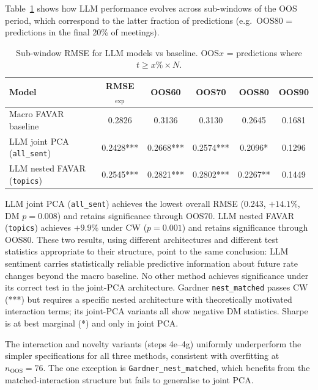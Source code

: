 Table~\ref{tab:oos_subwindow} shows how LLM performance evolves across sub-windows of the OOS period, which correspond to the latter fraction of predictions (e.g.\ OOS80 = predictions in the final 20\% of meetings).

\begin{table}[ht]
\centering
\caption{Sub-window RMSE for LLM models vs baseline. OOS$x$ = predictions where $t \geq x\% \times N$.}
\label{tab:oos_subwindow}
\small
\begin{tabular}{lccccc}
\toprule
Model & RMSE$_{\exp}$ & OOS60 & OOS70 & OOS80 & OOS90 \\
\midrule
Macro FAVAR baseline       & 0.2826 & 0.3136 & 0.3130 & 0.2645 & 0.1681 \\
LLM joint PCA (\texttt{all\_sent})  & 0.2428*** & 0.2668*** & 0.2574*** & 0.2096* & 0.1296 \\
LLM nested FAVAR (\texttt{topics})  & 0.2545*** & 0.2821*** & 0.2802*** & 0.2267** & 0.1449 \\
\bottomrule
\end{tabular}
\end{table}

\smallskip

LLM joint PCA (\texttt{all\_sent}) achieves the lowest overall RMSE (0.243, $+14.1\%$, DM $p = 0.008$) and retains significance through OOS70. LLM nested FAVAR (\texttt{topics}) achieves $+9.9\%$ under CW ($p = 0.001$) and retains significance through OOS80. These two results, using different architectures and different test statistics appropriate to their structure, point to the same conclusion: LLM sentiment carries statistically reliable predictive information about future rate changes beyond the macro baseline. No other method achieves significance under its correct test in the joint-PCA architecture. Gardner \texttt{nest\_matched} passes CW (***) but requires a specific nested architecture with theoretically motivated interaction terms; its joint-PCA variants all show negative DM statistics. Sharpe is at best marginal (*) and only in joint PCA.

The interaction and novelty variants (steps 4e--4g) uniformly underperform the simpler specifications for all three methods, consistent with overfitting at $n_{\text{OOS}} = 76$. The one exception is \texttt{Gardner\_nest\_matched}, which benefits from the matched-interaction structure but fails to generalise to joint PCA.


